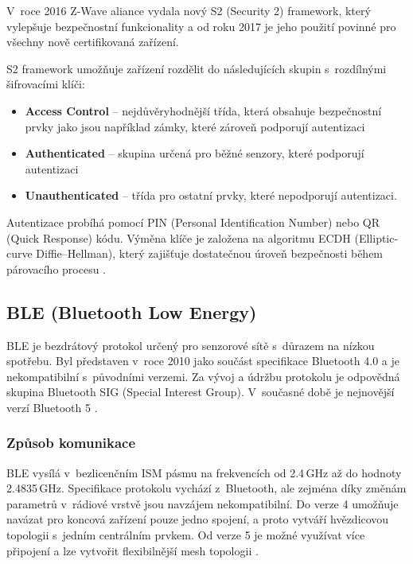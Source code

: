  V~roce 2016 Z-Wave aliance vydala nový S2 (Security 2) framework, který vylepšuje bezpečnostní funkcionality 
 a od roku 2017 je jeho použití povinné pro všechny nově certifikovaná zařízení. 
 
 S2 framework umožňuje zařízení rozdělit do následujících skupin s~rozdílnými šifrovacími klíči:
 \begin{itemize}
  \item \textbf{Access Control} -- 
   nejdůvěryhodnější třída, která obsahuje bezpečnostní prvky jako jsou například zámky,
   které zároveň podporují autentizaci
  \item \textbf{Authenticated} -- 
  skupina určená pro běžné senzory, které podporují autentizaci 
  \item \textbf{Unauthenticated} -- 
  třída pro ostatní prvky, které nepodporují autentizaci.
 \end{itemize}
 Autentizace probíhá pomocí PIN (Personal Identification Number) nebo QR (Quick Response) kódu.
 Výměna klíče je založena na algoritmu ECDH (Elliptic-curve Diffie–Hellman), který zajišťuje 
 dostatečnou úroveň bezpečnosti během párovacího procesu \cite{cesnet-survey}.

 
  \subsection{BLE (Bluetooth Low Energy)} 
  BLE je bezdrátový protokol určený pro senzorové sítě s~důrazem na nízkou spotřebu. Byl představen 
  v~roce 2010 jako součást specifikace Bluetooth 4.0 a je nekompatibilní s~původními verzemi. 
  Za vývoj a údržbu protokolu je odpovědná skupina Bluetooth SIG (Special Interest Group).
  V~současné době je nejnovější verzí Bluetooth 5 \cite{cesnet-survey}.
  
  \subsubsection{Způsob komunikace}
  BLE vysílá v~bezlicenčním ISM pásmu na frekvencích od 2.4\,GHz až do hodnoty 2.4835\,GHz. Specifikace
  protokolu vychází z~Bluetooth, ale zejména díky změnám parametrů v~rádiové vrstvě 
  jsou navzájem nekompatibilní. Do verze 4 umožňuje navázat pro koncová zařízení pouze jedno spojení,
  a proto 
  vytváří hvězdicovou topologii s~jedním centrálním prvkem. Od verze 5 je možné využívat více připojení
  a lze vytvořit flexibilnější mesh topologii \cite{cesnet-survey}. 
  
